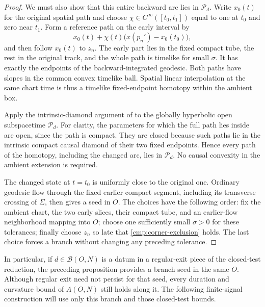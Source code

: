 \begin{proof}
We must also show that this entire backward arc lies in
$\mathcal P_d$. Write $x_0(t)$ for the original spatial path and
choose $\chi\in C^\infty([t_0,t_1])$ equal to one at $t_0$ and zero
near $t_1$. Form a reference path on the early interval by
\[
 x_0(t)+\chi(t)\bigl(x(p_n')-x_0(t_0)\bigr),
\]
and then follow $x_0(t)$ to $z_n$. The early part lies in the fixed
compact tube, the rest in the original track, and the whole path is
timelike for small $\sigma$. It has exactly the endpoints of the
backward-integrated geodesic. Both paths have slopes in the common
convex timelike ball. Spatial linear interpolation at the same chart
time is thus a timelike fixed-endpoint homotopy within the ambient box.

Apply the intrinsic-diamond argument of  to the
globally hyperbolic open subspacetime $\mathcal P_d$. For clarity, the
parameters for which the full path lies inside are open, since the path
is compact. They are closed because such paths lie in the intrinsic
compact causal diamond of their two fixed endpoints. Hence every path
of the homotopy, including the changed arc, lies in $\mathcal P_d$.
No causal convexity in the ambient extension is required.

The changed state at $t=t_0$ is uniformly close to the original one.
Ordinary geodesic flow through the fixed earlier compact segment,
including its transverse crossing of $\Sigma$, then gives a seed in
$O$. The choices have the following order: fix the ambient chart, the
two early slices, their compact tube, and an earlier-flow neighborhood
mapping into $O$; choose one sufficiently small $\sigma>0$ for these
tolerances; finally choose $z_n$ so late that
\eqref{cmp:corner-exclusion} holds. The last choice forces a branch
without changing any preceding tolerance.
\end{proof}

In particular, if $d\in\mathcal B(O,N)$ is a datum in a regular-exit
piece of the closed-test reduction, the preceding proposition provides
a branch seed in the same $O$. Although regular exit need not persist
for that seed, every duration and curvature bound of $A(O,N)$ still
holds along it. The following finite-signal construction will use only
this branch and those closed-test bounds.
